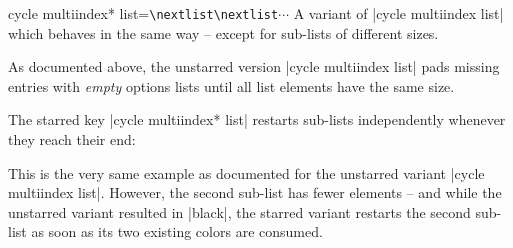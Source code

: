 \begin{pgfplotskey}{cycle multiindex* list=\texttt{\textbackslash nextlist}\texttt{\textbackslash nextlist}$\dotsb$}
	A variant of |cycle multiindex list| which behaves in the same way -- except for sub-lists of different sizes.

	As documented above, the unstarred version |cycle multiindex list| pads missing entries with \emph{empty} options lists until all list elements have the same size.

	The starred key |cycle multiindex* list| restarts sub-lists independently whenever they reach their end:

\begin{codeexample}[]
\end{codeexample}
	This is the very same example as documented for the unstarred variant |cycle multiindex list|. However, the second sub-list has fewer elements -- and while the unstarred variant resulted in |black|, the starred variant restarts the second sub-list as soon as its two existing colors are consumed.


\end{pgfplotskey}
